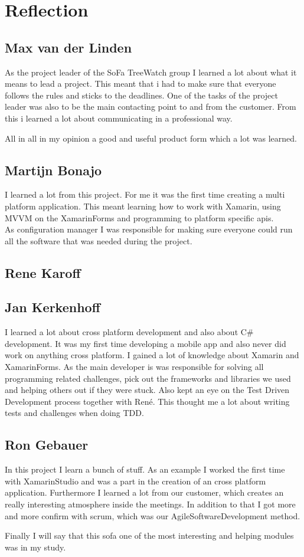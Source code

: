 \section{Reflection}
\subsection{Max van der Linden}
As the project leader of the SoFa TreeWatch group I learned a lot about what it means to lead a project. This meant that i had to make sure that everyone follows the rules and sticks to the deadlines. One of the tasks of the project leader was also to be the main contacting point to and from the customer. From this i learned a lot about communicating in a professional way.

All in all in my opinion a good and useful product form which a lot was learned.

\subsection{Martijn Bonajo}

I learned a lot from this project. For me it was the first time creating a multi platform application. This meant learning how to work with Xamarin, using MVVM on the \gls{XamarinForms} and programming to platform specific \gls{api}s.\\
As configuration manager I was responsible for making sure everyone could run all the software that was needed during the project.

\subsection{Rene Karoff}


\subsection{Jan Kerkenhoff}
I learned a lot about cross platform development and also about C# development. It was my first time developing a mobile app and also never did work on anything cross platform. I gained a lot of knowledge about Xamarin and \gls{XamarinForms}.
As the main developer is was responsible for solving all programming related challenges, pick out the frameworks and libraries we used and helping others out if they were stuck. Also kept an eye on the Test Driven Development process together with René. This thought me a lot about writing tests and challenges when doing TDD.


\subsection{Ron Gebauer}
In this project I learn a bunch of stuff. As an example I worked the first time with \gls{XamarinStudio} and was a part in the creation of an cross platform application. Furthermore I learned a lot from our customer, which creates an really interesting atmosphere inside the meetings. In addition to that I got more and more confirm with \gls{scrum}, which was our \gls{AgileSoftwareDevelopment} method.

Finally I will say that this \gls{sofa} one of the most interesting and helping modules was in my study.